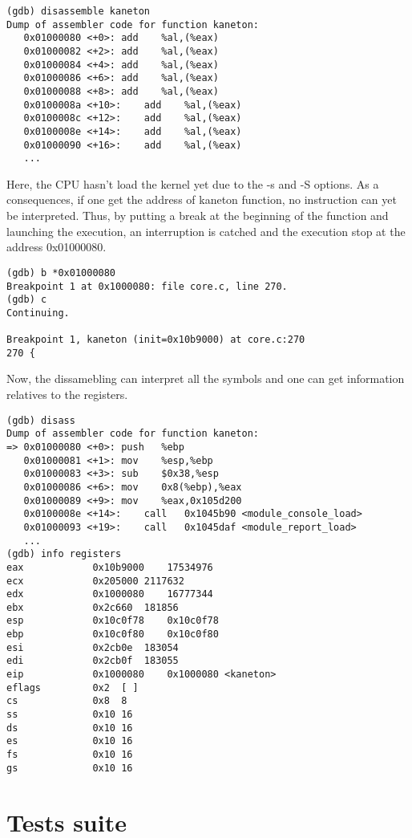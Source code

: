 \begin{verbatim}
(gdb) disassemble kaneton
Dump of assembler code for function kaneton:
   0x01000080 <+0>:	add    %al,(%eax)
   0x01000082 <+2>:	add    %al,(%eax)
   0x01000084 <+4>:	add    %al,(%eax)
   0x01000086 <+6>:	add    %al,(%eax)
   0x01000088 <+8>:	add    %al,(%eax)
   0x0100008a <+10>:	add    %al,(%eax)
   0x0100008c <+12>:	add    %al,(%eax)
   0x0100008e <+14>:	add    %al,(%eax)
   0x01000090 <+16>:	add    %al,(%eax)
   ...
\end{verbatim}
Here, the CPU hasn't load the kernel yet due to the -s and -S options. As a consequences, if one get the address of kaneton function, no instruction can yet be interpreted. Thus, by putting a break at the beginning of the function and launching the execution, an interruption is catched and the execution stop at the address 0x01000080.

\begin{verbatim}
(gdb) b *0x01000080
Breakpoint 1 at 0x1000080: file core.c, line 270.
(gdb) c
Continuing.

Breakpoint 1, kaneton (init=0x10b9000) at core.c:270
270	{
\end{verbatim}

Now, the dissamebling can interpret all the symbols and one can get information relatives to the registers.

\begin{verbatim}
(gdb) disass
Dump of assembler code for function kaneton:
=> 0x01000080 <+0>:	push   %ebp
   0x01000081 <+1>:	mov    %esp,%ebp
   0x01000083 <+3>:	sub    $0x38,%esp
   0x01000086 <+6>:	mov    0x8(%ebp),%eax
   0x01000089 <+9>:	mov    %eax,0x105d200
   0x0100008e <+14>:	call   0x1045b90 <module_console_load>
   0x01000093 <+19>:	call   0x1045daf <module_report_load>
   ...
(gdb) info registers
eax            0x10b9000	17534976
ecx            0x205000	2117632
edx            0x1000080	16777344
ebx            0x2c660	181856
esp            0x10c0f78	0x10c0f78
ebp            0x10c0f80	0x10c0f80
esi            0x2cb0e	183054
edi            0x2cb0f	183055
eip            0x1000080	0x1000080 <kaneton>
eflags         0x2	[ ]
cs             0x8	8
ss             0x10	16
ds             0x10	16
es             0x10	16
fs             0x10	16
gs             0x10	16
\end{verbatim}
\chapter{Tests suite}
\label{chapter:Tests suite}

